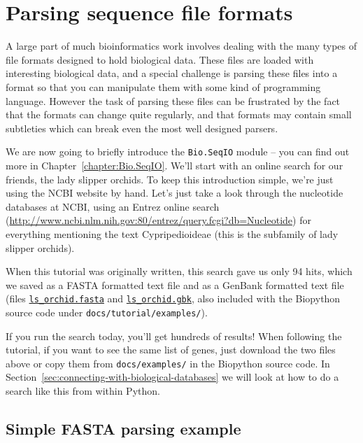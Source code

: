 \documentclass{report}
\begin{document}
\section{Parsing sequence file formats}
\label{sec:sequence-parsing}

A large part of much bioinformatics work involves dealing with the many types of file formats designed to hold biological data. These files are loaded with interesting biological data, and a special challenge is parsing these files into a format so that you can manipulate them with some kind of programming language. However the task of parsing these files can be frustrated by the fact that the formats can change quite regularly, and that formats may contain small subtleties which can break even the most well designed parsers.

We are now going to briefly introduce the \verb|Bio.SeqIO| module -- you can find out more in Chapter~\ref{chapter:Bio.SeqIO}.  We'll start with an online search for our friends, the lady slipper orchids. To keep this introduction simple, we're just using the NCBI website by hand.  Let's just take a look through the nucleotide databases at NCBI, using an Entrez online search (\url{http://www.ncbi.nlm.nih.gov:80/entrez/query.fcgi?db=Nucleotide}) for everything mentioning the text Cypripedioideae (this is the subfamily of lady slipper orchids).  

When this tutorial was originally written, this search gave us only 94 hits, which we saved as a FASTA formatted text file and as a GenBank formatted text file (files \href{http://biopython.org/DIST/docs/tutorial/examples/ls_orchid.fasta}{\tt ls\_orchid.fasta} and \href{http://biopython.org/DIST/docs/tutorial/examples/ls_orchid.gbk}{\tt ls\_orchid.gbk}, also included with the Biopython source code under {\tt docs/tutorial/examples/}).


If you run the search today, you'll get hundreds of results!  When following the tutorial, if you want to see the same list of genes, just download the two files above or copy them from \verb|docs/examples/| in the Biopython source code.  In Section~\ref{sec:connecting-with-biological-databases} we will look at how to do a search like this from within Python.

\subsection{Simple FASTA parsing example}
\label{sec:fasta-parsing}
\end{document}
